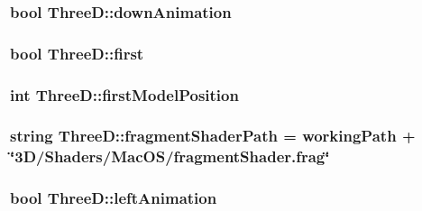 \subsubsection[{\texorpdfstring{down\+Animation}{downAnimation}}]{\setlength{\rightskip}{0pt plus 5cm}bool Three\+D\+::down\+Animation\hspace{0.3cm}{\ttfamily [private]}}\hypertarget{classThreeD_ad0852e7fce074e4bd6fbe6ea59d1fdd0}{}\label{classThreeD_ad0852e7fce074e4bd6fbe6ea59d1fdd0}
\subsubsection[{\texorpdfstring{first}{first}}]{\setlength{\rightskip}{0pt plus 5cm}bool Three\+D\+::first\hspace{0.3cm}{\ttfamily [private]}}\hypertarget{classThreeD_a0c77a57282a44dda09d831baa75d8d2f}{}\label{classThreeD_a0c77a57282a44dda09d831baa75d8d2f}
\subsubsection[{\texorpdfstring{first\+Model\+Position}{firstModelPosition}}]{\setlength{\rightskip}{0pt plus 5cm}int Three\+D\+::first\+Model\+Position\hspace{0.3cm}{\ttfamily [private]}}\hypertarget{classThreeD_a430fa8b4d8d04de359a6422d7bb533c1}{}\label{classThreeD_a430fa8b4d8d04de359a6422d7bb533c1}
\subsubsection[{\texorpdfstring{fragment\+Shader\+Path}{fragmentShaderPath}}]{\setlength{\rightskip}{0pt plus 5cm}string Three\+D\+::fragment\+Shader\+Path = {\bf working\+Path} + \char`\"{}3\+D/\+Shaders/\+Mac\+O\+S/fragment\+Shader.\+frag\char`\"{}\hspace{0.3cm}{\ttfamily [private]}}\hypertarget{classThreeD_a53baa9e879782cda613dfc831ee48281}{}\label{classThreeD_a53baa9e879782cda613dfc831ee48281}
\subsubsection[{\texorpdfstring{left\+Animation}{leftAnimation}}]{\setlength{\rightskip}{0pt plus 5cm}bool Three\+D\+::left\+Animation\hspace{0.3cm}{\ttfamily [private]}}\hypertarget{classThreeD_a93f3dd02240c35bd5f55fc3660ceb53b}{}\label{classThreeD_a93f3dd02240c35bd5f55fc3660ceb53b}
